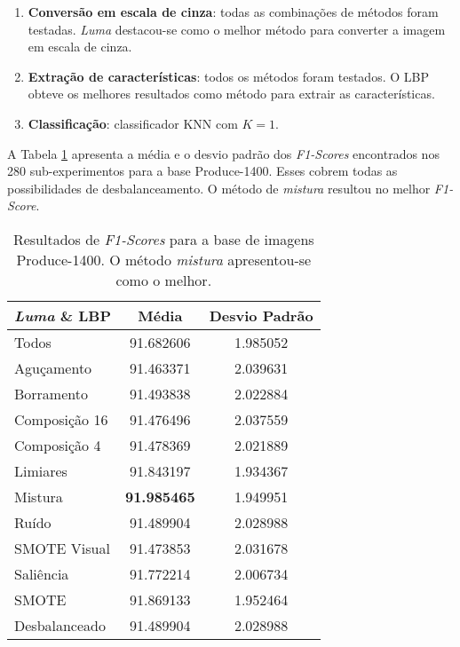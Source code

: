 \begin{enumerate}
\item \textbf{Conversão em escala de cinza}: todas as combinações de métodos foram testadas. \emph{Luma} destacou-se como o melhor método para converter a imagem em escala de cinza.
\item \textbf{Extração de características}: todos os métodos foram testados. O LBP obteve os melhores resultados como método para extrair as características.
\item \textbf{Classificação}: classificador KNN com $K=1$.
\end{enumerate}


A Tabela \ref{tab:resultados:3.3} apresenta a média e o desvio padrão dos \textit{F1-Scores} encontrados nos 280 sub-experimentos para a base Produce-1400. Esses cobrem todas as possibilidades de desbalanceamento. O método de \emph{mistura} resultou no melhor \textit{F1-Score}.

\begin{table}[!htbp]
\begin{center}
\caption{Resultados de \textit{F1-Scores} para a base de imagens Produce-1400. O método \emph{mistura} apresentou-se como o melhor.}
\label{tab:resultados:3.3}
\begin{tabular}{|l|c|c|}
\hline
\textbf{\emph{Luma} \& LBP} & \textbf{Média}     & \textbf{Desvio Padrão} \\ \hline
   Todos        &  91.682606 &  1.985052  \\ \hline
  Aguçamento    &  91.463371 &  2.039631  \\ \hline
  Borramento    &  91.493838 &  2.022884  \\ \hline
  Composição 16 &  91.476496 &  2.037559  \\ \hline
  Composição 4  &  91.478369 &  2.021889  \\ \hline
  Limiares      &  91.843197 &  1.934367  \\ \hline
  Mistura       &  \textbf{91.985465} &  1.949951  \\ \hline
  Ruído         &  91.489904 &  2.028988  \\ \hline
  SMOTE Visual  &  91.473853 &  2.031678  \\ \hline
  Saliência     &  91.772214 &  2.006734  \\ \hline
 SMOTE          &  91.869133 &  1.952464  \\ \hline
Desbalanceado   &  91.489904 &  2.028988  \\ \hline
\end{tabular}
\end{center}
\end{table}

